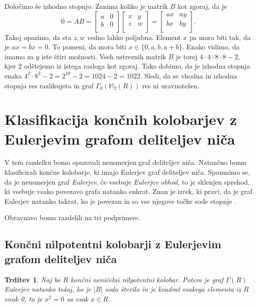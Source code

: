\documentclass[a4paper, 12pt]{amsart}
\theoremstyle{definition} %
\theoremstyle{plain} %
\newtheorem{trditev}[definicija]{Trditev}
\newcommand{\M}{\mathbb M}
\begin{document}
Določimo še izhodno stopnjo. Zanima koliko je matrik $B$ kot zgoraj, da je 
$$
0 = AB = \begin{bmatrix}
a & 0 \\
b & 0 \\
\end{bmatrix}
\begin{bmatrix}
x & y \\
z & w \\
\end{bmatrix}
=
\begin{bmatrix}
ax & ay \\
bx & by \\
\end{bmatrix}.
$$
Takoj opazimo, da sta $z,w$ vedno lahko poljubna. Element $x$ pa mora biti tak, da je $ax = bx = 0$. To pomeni, da mora biti $x\in \{0,a,b,a+b\}$. Enako vidimo, da imamo za $y$ iste štiri možnosti. Vseh ustreznih matrik $B$ je torej $4\cdot 4 \cdot 8 \cdot 8 -2$, kjer 2 odštejemo iz istega razloga kot zgoraj. Tako dobimo, da je izhodna stopnja enaka $4^2 \cdot 8^2 - 2 = 2^{10}-2 = 1024-2 = 1022$. Sledi, da se vhodna in izhodna stopnja res razlikujeta in graf $\Gamma_d(\M_2(R))$ res ni uravnotežen.
\endproof

\section{Klasifikacija končnih kolobarjev z Eulerjevim grafom deliteljev niča}
V tem razdelku bomo opazovali neusmerjen graf deliteljev niča. Natančno bomo klasificirali končne kolobarje, ki imajo Eulerjev graf deliteljev niča.
Spomnimo se, da je neusmerjen graf \emph{Eulerjev}, če vsebuje \emph{Eulerjev obhod}, to je sklenjen sprehod, ki vsebuje vsako povezavo grafa natanko enkrat. Znan je izrek, ki pravi, da je graf Eulerjev natanko takrat, ko je povezan in so vse njegove točke sode stopnje \cite[Theorem 1.8.1]{Diestel}.

 Obravnavo bomo razdelili na tri podprimere.

\subsection{Končni nilpotentni kolobarji z Eulerjevim grafom deliteljev niča}

\begin{trditev}
\label{EulerNilpotenten}
Naj bo $R$ končni neničelni nilpotentni kolobar. Potem je graf $\Gamma(R)$ Eulerjev natanko tedaj, ko je $|R|$ sodo število in je kvadrat vsakega elementa iz $R$ enak 0, to je $x^2=0$ za vsak $x\in R$.
\end{trditev}
\end{document}
